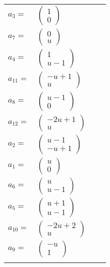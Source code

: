 \documentclass[1p]{elsarticle_modified}
\theoremstyle{definition}
\begin{document}
\begin{tabular}{m{7pt} m{180pt} m{7pt} m{180pt} }
\flushright $a_{3}=$&$\begin{pmatrix}1\\0\end{pmatrix}$ \\
\flushright $a_{7}=$&$\begin{pmatrix}0\\u\end{pmatrix}$ \\
\flushright $a_{4}=$&$\begin{pmatrix}1\\u-1\end{pmatrix}$ \\
\flushright $a_{11}=$&$\begin{pmatrix}- u+1\\u\end{pmatrix}$ \\
\flushright $a_{8}=$&$\begin{pmatrix}u-1\\0\end{pmatrix}$ \\
\flushright $a_{12}=$&$\begin{pmatrix}-2 u+1\\u\end{pmatrix}$ \\
\flushright $a_{2}=$&$\begin{pmatrix}u-1\\- u+1\end{pmatrix}$ \\
\flushright $a_{1}=$&$\begin{pmatrix}u\\0\end{pmatrix}$ \\
\flushright $a_{6}=$&$\begin{pmatrix}u\\u-1\end{pmatrix}$ \\
\flushright $a_{5}=$&$\begin{pmatrix}u+1\\u-1\end{pmatrix}$ \\
\flushright $a_{10}=$&$\begin{pmatrix}-2 u+2\\u\end{pmatrix}$ \\
\flushright $a_{9}=$&$\begin{pmatrix}- u\\1\end{pmatrix}$\\&\end{tabular}
\end{document}

